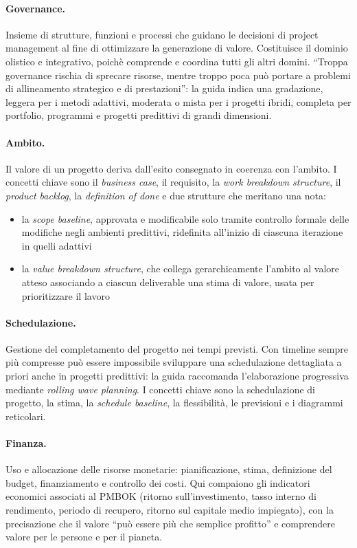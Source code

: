 \paragraph{Governance.} Insieme di strutture, funzioni e processi che guidano
le decisioni di project management al fine di ottimizzare la generazione di valore.
Costituisce il dominio olistico e integrativo, poich\`e comprende e coordina 
tutti gli altri domini. ``Troppa governance
rischia di sprecare risorse, mentre troppo poca pu\`o portare a problemi di
allineamento strategico e di prestazioni'': la guida indica una gradazione,
leggera per i metodi adattivi, moderata o mista per i progetti ibridi, completa
per portfolio, programmi e progetti predittivi di grandi dimensioni.

\paragraph{Ambito.} Il valore di un progetto deriva dall'esito consegnato in
coerenza con l'ambito. I concetti chiave sono il \emph{business case}, il
requisito, la \emph{work breakdown structure}, il \emph{product backlog}, la
\emph{definition of done} e due strutture che meritano una nota:
\begin {itemize}
\item la \emph{scope baseline}, approvata e modificabile solo tramite controllo
formale delle modifiche negli ambienti predittivi, ridefinita all'inizio di
ciascuna iterazione in quelli adattivi
\item la \emph{value breakdown structure}, che collega gerarchicamente l'ambito
al valore atteso associando a ciascun deliverable una stima di valore, usata per
prioritizzare il lavoro
\end {itemize}

\paragraph{Schedulazione.} Gestione del completamento del progetto nei tempi
previsti. Con timeline sempre pi\`u compresse pu\`o essere impossibile
sviluppare una schedulazione dettagliata a priori anche in progetti predittivi:
la guida raccomanda l'elaborazione progressiva mediante \emph{rolling wave
planning}. I concetti chiave sono la schedulazione di progetto, la stima, la
\emph{schedule baseline}, la flessibilit\`a, le previsioni e i diagrammi
reticolari.

\paragraph{Finanza.} Uso e allocazione delle risorse monetarie: pianificazione,
stima, definizione del budget, finanziamento e controllo dei costi. Qui
compaiono gli indicatori economici associati al PMBOK (ritorno
sull'investimento, tasso interno di rendimento, periodo di recupero, ritorno sul
capitale medio impiegato), con la precisazione che il valore ``pu\`o essere
pi\`u che semplice profitto'' e comprendere valore per le persone e per il
pianeta.

